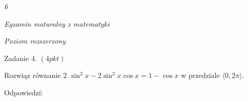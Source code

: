 \documentclass[a4paper,12pt]{article}
\begin{document}
{\it 6}

{\it Egzamin maturalny z matematyki}

{\it Poziom rozszerzony}

Zadanie 4. $(4pkt)$

Rozwiąz równanie 2 $\sin^{2}x-2\sin^{2}x\cos x=1-\cos x$ w przedziale $\langle 0,2\pi\rangle.$

Odpowiedzí:
\end{document}
